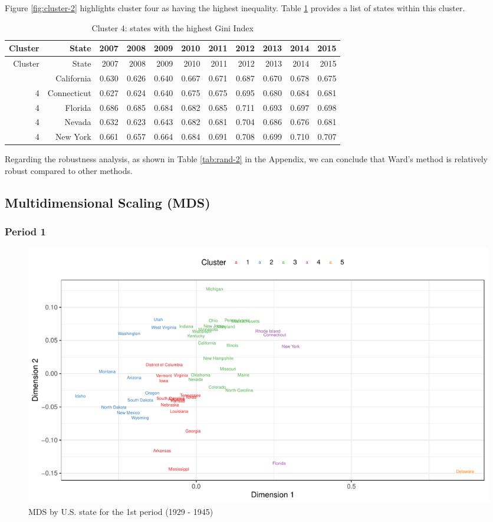 \documentclass[11pt,a4paper,]{article}
\begin{document}
Figure \ref{fig:cluster-2} highlights cluster four as having the highest inequality. Table \ref{tab:gini2-clust4} provides a list of states within this cluster.

\begin{longtable}[]{@{}rrrrrrrrrrr@{}}
\caption{\label{tab:gini2-clust4}Cluster 4: states with the highest Gini Index}\tabularnewline
\toprule\noalign{}
Cluster & State & 2007 & 2008 & 2009 & 2010 & 2011 & 2012 & 2013 & 2014 & 2015 \\
\midrule\noalign{}
\endfirsthead
\toprule\noalign{}
Cluster & State & 2007 & 2008 & 2009 & 2010 & 2011 & 2012 & 2013 & 2014 & 2015 \\
\midrule\noalign{}
\endhead
\bottomrule\noalign{}
\endlastfoot
4 & California & 0.630 & 0.626 & 0.640 & 0.667 & 0.671 & 0.687 & 0.670 & 0.678 & 0.675 \\
4 & Connecticut & 0.627 & 0.624 & 0.640 & 0.675 & 0.675 & 0.695 & 0.680 & 0.684 & 0.681 \\
4 & Florida & 0.686 & 0.685 & 0.684 & 0.682 & 0.685 & 0.711 & 0.693 & 0.697 & 0.698 \\
4 & Nevada & 0.632 & 0.623 & 0.643 & 0.682 & 0.681 & 0.704 & 0.686 & 0.676 & 0.681 \\
4 & New York & 0.661 & 0.657 & 0.664 & 0.684 & 0.691 & 0.708 & 0.699 & 0.710 & 0.707 \\
\end{longtable}

Regarding the robustness analysis, as shown in Table \ref{tab:rand-2} in the Appendix, we can conclude that Ward's method is relatively robust compared to other methods.

\newpage

\hypertarget{multidimensional-scaling-mds}{%
\subsection{Multidimensional Scaling (MDS)}\label{multidimensional-scaling-mds}}

\hypertarget{period-1-1}{%
\subsubsection{Period 1}\label{period-1-1}}

\begin{figure}
\centering
\includegraphics{Assignment_2_ETF5500_files/figure-latex/mds1-1.pdf}
\caption{\label{fig:mds1}MDS by U.S. state for the 1st period (1929 - 1945)}
\end{figure}
\end{document}
